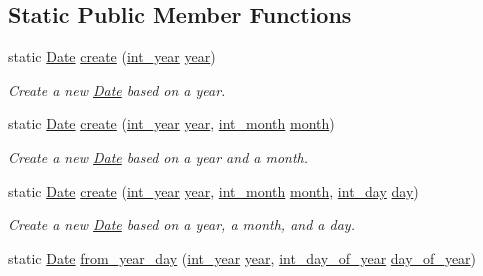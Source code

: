 \subsection*{Static Public Member Functions}
\begin{DoxyCompactItemize}
\item 
static \hyperlink{structDate}{Date} \hyperlink{structDate_af6a6aa2e75464311dc7eee91e25aee47}{create} (\hyperlink{types_8h_a7ff53e164374f5b24e06f3c04362e61d}{int\-\_\-year} \hyperlink{structDate_aac4f4635d8db0ea1a32c2f979a1a6cc0}{year})
\begin{DoxyCompactList}\small\item\em Create a new \hyperlink{structDate}{Date} based on a year. \end{DoxyCompactList}\item 
static \hyperlink{structDate}{Date} \hyperlink{structDate_a0b1280e69ec6310ec8cdfb730e8dd7f6}{create} (\hyperlink{types_8h_a7ff53e164374f5b24e06f3c04362e61d}{int\-\_\-year} \hyperlink{structDate_aac4f4635d8db0ea1a32c2f979a1a6cc0}{year}, \hyperlink{types_8h_a6e77e4e37237551e3c2f808f02764cec}{int\-\_\-month} \hyperlink{structDate_a39f4a9fd570f306025f78447477e42d6}{month})
\begin{DoxyCompactList}\small\item\em Create a new \hyperlink{structDate}{Date} based on a year and a month. \end{DoxyCompactList}\item 
static \hyperlink{structDate}{Date} \hyperlink{structDate_ae0bcc2332237bf0f5b57ed646a00e6ac}{create} (\hyperlink{types_8h_a7ff53e164374f5b24e06f3c04362e61d}{int\-\_\-year} \hyperlink{structDate_aac4f4635d8db0ea1a32c2f979a1a6cc0}{year}, \hyperlink{types_8h_a6e77e4e37237551e3c2f808f02764cec}{int\-\_\-month} \hyperlink{structDate_a39f4a9fd570f306025f78447477e42d6}{month}, \hyperlink{types_8h_a2ee09cac57b5b71a2cf76051e877f320}{int\-\_\-day} \hyperlink{structDate_ac4993265144899a83ee57cd6d54d3bff}{day})
\begin{DoxyCompactList}\small\item\em Create a new \hyperlink{structDate}{Date} based on a year, a month, and a day. \end{DoxyCompactList}\item 
static \hyperlink{structDate}{Date} \hyperlink{structDate_af3a7ed97e385d134e39c42092d082405}{from\-\_\-year\-\_\-day} (\hyperlink{types_8h_a7ff53e164374f5b24e06f3c04362e61d}{int\-\_\-year} \hyperlink{structDate_aac4f4635d8db0ea1a32c2f979a1a6cc0}{year}, \hyperlink{types_8h_ae73cc4736210d3120e1073d94bbac092}{int\-\_\-day\-\_\-of\-\_\-year} \hyperlink{structDate_aa1aaeb37af12be4ac07337b5e4ba8206}{day\-\_\-of\-\_\-year})

\end{DoxyCompactItemize}
